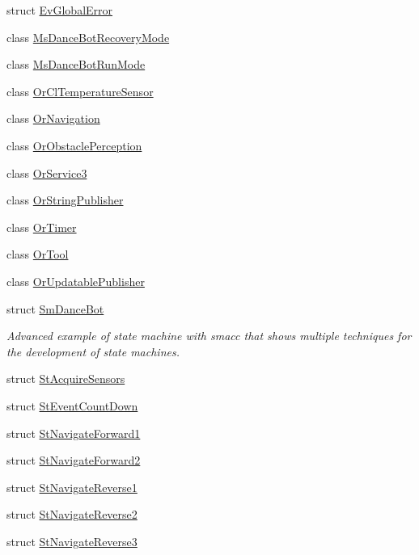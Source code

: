 \begin{DoxyCompactItemize}
struct \hyperlink{structsm__dance__bot_1_1EvGlobalError}{Ev\+Global\+Error}
\item 
class \hyperlink{classsm__dance__bot_1_1MsDanceBotRecoveryMode}{Ms\+Dance\+Bot\+Recovery\+Mode}
\item 
class \hyperlink{classsm__dance__bot_1_1MsDanceBotRunMode}{Ms\+Dance\+Bot\+Run\+Mode}
\item 
class \hyperlink{classsm__dance__bot_1_1OrClTemperatureSensor}{Or\+Cl\+Temperature\+Sensor}
\item 
class \hyperlink{classsm__dance__bot_1_1OrNavigation}{Or\+Navigation}
\item 
class \hyperlink{classsm__dance__bot_1_1OrObstaclePerception}{Or\+Obstacle\+Perception}
\item 
class \hyperlink{classsm__dance__bot_1_1OrService3}{Or\+Service3}
\item 
class \hyperlink{classsm__dance__bot_1_1OrStringPublisher}{Or\+String\+Publisher}
\item 
class \hyperlink{classsm__dance__bot_1_1OrTimer}{Or\+Timer}
\item 
class \hyperlink{classsm__dance__bot_1_1OrTool}{Or\+Tool}
\item 
class \hyperlink{classsm__dance__bot_1_1OrUpdatablePublisher}{Or\+Updatable\+Publisher}
\item 
struct \hyperlink{structsm__dance__bot_1_1SmDanceBot}{Sm\+Dance\+Bot}
\begin{DoxyCompactList}\small\item\em Advanced example of state machine with smacc that shows multiple techniques for the development of state machines. \end{DoxyCompactList}\item 
struct \hyperlink{structsm__dance__bot_1_1StAcquireSensors}{St\+Acquire\+Sensors}
\item 
struct \hyperlink{structsm__dance__bot_1_1StEventCountDown}{St\+Event\+Count\+Down}
\item 
struct \hyperlink{structsm__dance__bot_1_1StNavigateForward1}{St\+Navigate\+Forward1}
\item 
struct \hyperlink{structsm__dance__bot_1_1StNavigateForward2}{St\+Navigate\+Forward2}
\item 
struct \hyperlink{structsm__dance__bot_1_1StNavigateReverse1}{St\+Navigate\+Reverse1}
\item 
struct \hyperlink{structsm__dance__bot_1_1StNavigateReverse2}{St\+Navigate\+Reverse2}
\item 
struct \hyperlink{structsm__dance__bot_1_1StNavigateReverse3}{St\+Navigate\+Reverse3}

\end{DoxyCompactItemize}
